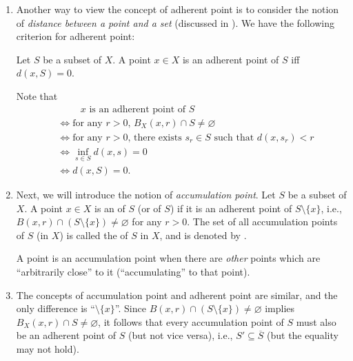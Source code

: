 \begin{enumerate}
\item Another way to view the concept of adherent point is to consider the
notion of \emph{distance between a point and a set} (discussed in
). We have the following criterion for
adherent point:
\begin{proposition}
\label{prp:adherent-zero-dist-from-set}
Let \(S\) be a subset of \(X\). A point \(x\in X\) is an adherent point of
\(S\) iff \(d(x,S)=0\).
\end{proposition}
\begin{pf}
Note that
\begin{align*}
&\hspace{1cm}\text{\(x\) is an adherent point of \(S\)}\\
&\iff \text{for any \(r>0\), \(B_X(x,r)\cap S\ne\varnothing\)}\\
&\iff\text{for any \(r>0\), there exists \(s_r\in S\) such that \(d(x,s_r)<r\)}\\
&\iff \inf_{s\in S}d(x,s)=0\\
&\iff d(x,S)=0.
\end{align*}
\end{pf}

\item Next, we will introduce the notion of \emph{accumulation point}. Let
\(S\) be a subset of \(X\). A point \(x\in X\) is an 
of \(S\) (or  of \(S\)) if it is an adherent point of
\(S\setminus\{x\}\), i.e., \(B(x,r)\cap(S\setminus\{x\})\ne\varnothing\) for
any \(r>0\). The set of all accumulation points of \(S\) (in \(X\)) is called
the  of \(S\) in \(X\), and is denoted by .


\begin{intuition}
A point is an accumulation point when there are \emph{other} points which are
``arbitrarily close'' to it (``accumulating'' to that point).
\begin{center}
\end{center}
\end{intuition}


\item The concepts of accumulation point and adherent point are similar, and
the only difference is ``\(\setminus\{x\}\)''. Since
\(B(x,r)\cap(S\setminus\{x\})\ne\varnothing\) implies \(B_X(x,r)\cap
S\ne\varnothing\), it follows that every accumulation point of \(S\) must also
be an adherent point of \(S\) (but not vice versa), i.e., \(S'\subseteq
\overline{S}\) (but the equality may not hold).


\end{enumerate}
